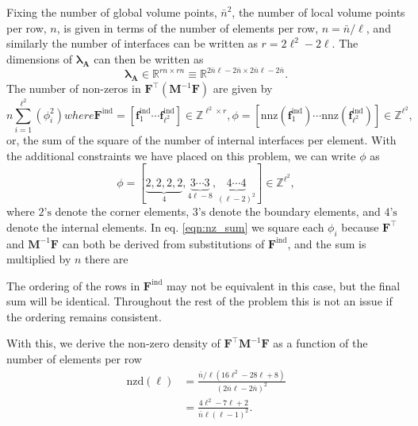 Fixing the number of global volume points, $\bar{n}^2$, the number of local volume points per row, $n$, is given in terms of the number of elements per row, $n = \bar{n} / \ell$, and similarly the number of interfaces can be written as $r = 2\ell^2 - 2\ell$. 
The dimensions of $\symbf{\lambda}_\textbf{A}$ can then be written as 
\begin{equation}
	\symbf{\lambda}_\textbf{A} \in \mathbb{R}^{rn \times rn} \equiv \mathbb{R}^{2\bar{n}\ell - 2\bar{n} \times 2\bar{n}\ell - 2\bar{n}}. 
\end{equation}
The number of non-zeros in $\textbf{F}^{\intercal}(\textbf{M}^{-1}\textbf{F})$ are given by
\begin{subequations}
\begin{equation}
	n \sum_{i=1}^{\ell^2} (\phi_i^2)
	\label{eqn:nz_sum}
\end{equation}
where
\begin{equation}
	\textbf{F}^{\text{ind}} = \left[\textbf{f}^{\text{ind}}_1 \cdots \textbf{f}^{\text{ind}}_{\ell^2}\right] \in \mathbb{Z}^{\ell^2 \times r},
\end{equation}
\begin{equation}
	\phi = \left[ \text{nnz}(\textbf{f}^{\text{ind}}_1) \cdots \text{nnz}(\textbf{f}^{\text{ind}}_{\ell^2}) \right] \in \mathbb{Z}^{\ell^2}, 
\end{equation}
\end{subequations}
or, the sum of the square of the number of internal interfaces per element. With the additional constraints we have placed on this problem, we can write $\phi$ as 
\begin{equation}
	\phi = \left[ \underbrace{2, 2, 2, 2}_{4}, \underbrace{3 \cdots 3}_{4\ell - 8}, \underbrace{4 \cdots 4}_{(\ell-2)^2} \right] \in \mathbb{Z}^{\ell^2}, 
\end{equation}
where $2\text{'s}$ denote the corner elements, $3\text{'s}$ denote the boundary elements, and $4\text{'s}$ denote the internal elements. In eq. \eqref{eqn:nz_sum} we square each $\phi_i$ because $\textbf{F}^{\intercal}$ and  $\textbf{M}^{-1}\textbf{F}$ can both be derived from substitutions of $\textbf{F}^{\text{ind}}$, and the sum is multiplied by $n$ there are 

The ordering of the rows in $\textbf{F}^{\text{ind}}$ may not be equivalent in this case, but the final sum will be identical. Throughout the rest of the problem this is not an issue if the ordering remains consistent. 

With this, we derive the non-zero density of $\textbf{F}^{\intercal}\textbf{M}^{-1}\textbf{F}$ as a function of the number of elements per row 
\begin{equation}
	\begin{aligned}
	\text{nzd}(\ell) &= \frac{\bar{n}/\ell (16\ell^2 - 28\ell + 8)}{(2\bar{n}\ell - 2\bar{n})^2} \\
	&= \frac{4\ell^2 - 7\ell + 2}{\bar{n}\ell(\ell-1)^2}.
	\end{aligned}
\end{equation}

